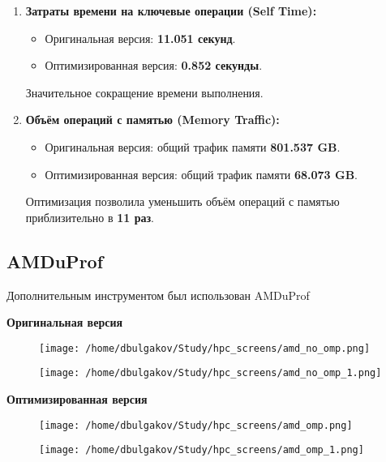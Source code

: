 \documentclass[12pt]{extarticle}
\begin{document}
\begin{spacing}{1.5}
\begin{enumerate}
        \item \textbf{Затраты времени на ключевые операции (Self Time):}
        \begin{itemize}
            \item Оригинальная версия: \textbf{11.051 секунд}.
            \item Оптимизированная версия: \textbf{0.852 секунды}.
        \end{itemize}
        Значительное сокращение времени выполнения.
    
        \item \textbf{Объём операций с памятью (Memory Traffic):}
        \begin{itemize}
            \item Оригинальная версия: общий трафик памяти \textbf{801.537 GB}.
            \item Оптимизированная версия: общий трафик памяти \textbf{68.073 GB}.
        \end{itemize}
        Оптимизация позволила уменьшить объём операций с памятью приблизительно в \textbf{11 раз}.
    \end{enumerate}

    \subsection{AMDuProf}
    Дополнительным инструментом был использован AMDuProf

    \par \textbf{Оригинальная версия}

    \begin{figure}[ht]
        \centering
        \texttt{[image: /home/dbulgakov/Study/hpc\_screens/amd\_no\_omp.png]}
    \end{figure}

    \begin{figure}[ht]
        \centering
        \texttt{[image: /home/dbulgakov/Study/hpc\_screens/amd\_no\_omp\_1.png]}
    \end{figure}

    \par \textbf{Оптимизированная версия}

    \begin{figure}[ht]
        \centering
        \texttt{[image: /home/dbulgakov/Study/hpc\_screens/amd\_omp.png]}
    \end{figure}

    \begin{figure}[ht]
        \centering
        \texttt{[image: /home/dbulgakov/Study/hpc\_screens/amd\_omp\_1.png]}
    \end{figure}


\end{spacing}
\end{document}
